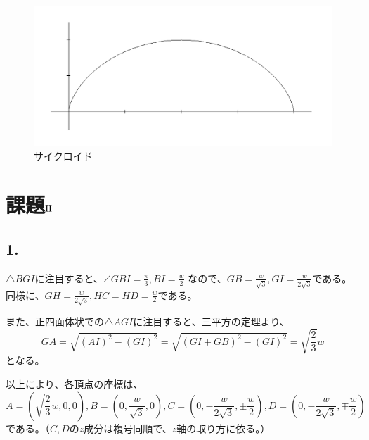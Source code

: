 \documentclass{jsarticle}
\begin{document}
        \begin{figure}[h]
            \centering
            \includegraphics[width=1\hsize]{cycloid.png}
            \caption{サイクロイド}
            \label{fig:cycloid}
        \end{figure}

\section*{課題$\rm I\hspace{-.01em}I$}
    \subsection*{1.}
        $\triangle BGI$に注目すると、$\displaystyle\angle GBI=\frac{\pi}{3}, BI= \frac{w}{2}$
        なので、$\displaystyle GB = \frac{w}{\sqrt{3}}, GI = \frac{w}{2\sqrt{3}}$である。
        同様に、$\displaystyle GH=\frac{w}{2\sqrt{3}}, HC=HD=\frac{w}{2}$である。

        また、正四面体状での$\triangle AGI$に注目すると、三平方の定理より、
        \begin{equation*}
            GA = \sqrt{(AI)^2 - (GI)^2} = \sqrt{(GI + GB)^2-(GI)^2}=\sqrt{\frac{2}{3}}w
        \end{equation*}
        となる。
        
        以上により、各頂点の座標は、
        \begin{equation*}
            A=\left(\sqrt{\frac{2}{3}}w,0,0\right),
            B=\left(0,\frac{w}{\sqrt{3}},0\right),
            C=\left(0,-\frac{w}{2\sqrt{3}},\pm\frac{w}{2}\right),
            D=\left(0,-\frac{w}{2\sqrt{3}},\mp\frac{w}{2}\right)
        \end{equation*}
        である。（$C,D$の$z$成分は複号同順で、$z$軸の取り方に依る。）
        
\end{document}
